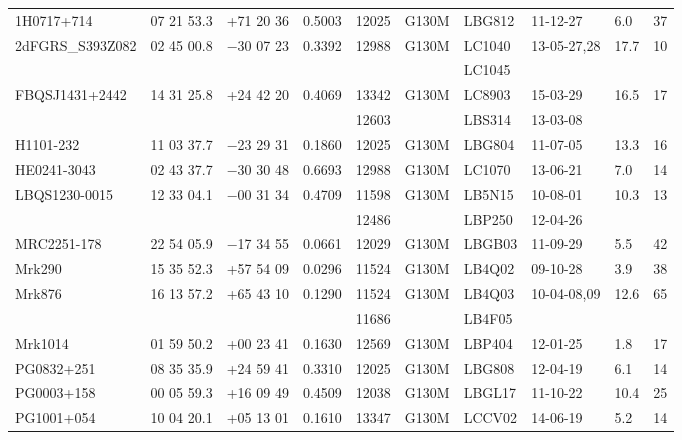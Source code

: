 \documentclass[twocolumn,tighten]{aastex6}
\begin{document}
\begin{table}[ht]
\begin{center}
\begin{tabular}{l l l l l l l l l l}
1H0717+714		  		&  07 21 53.3  &  +71 20  36	&    0.5003	& 12025	&   G130M	&   LBG812	& 11-12-27      	 	  &  6.0    &      37         \\
2dFGRS\_S393Z082  		&  02 45 00.8  &  $-$30 07  23	&    0.3392	& 12988	&   G130M	&   LC1040	& 13-05-27,28 	 	  & 17.7   &      10         \\
				  		&		       &			&			&		&			&    LC1045	&				  &	       &		   \\
FBQSJ1431+2442     		&  14 31 25.8  &  +24 42 20	&   0.4069		& 13342	&   G130M	&   LC8903	& 15-03-29		  & 16.5  &      17          \\
				 		&		       &			&			& 12603	&			&   LBS314	& 13-03-08		  &	      &		  	  \\
H1101-232   		 		&  11 03 37.7  &  $-$23 29 31	&   0.1860		& 12025	&   G130M	&   LBG804	& 11-07-05  		   & 13.3  &      16         \\
HE0241-3043  		 		&  02 43 37.7  &  $-$30 30 48	&   0.6693		& 12988	&   G130M	&   LC1070	& 13-06-21  		   & 7.0    &      14         \\
LBQS1230-0015  	 		&  12 33 04.1  &  $-$00 31 34    	&   0.4709		& 11598	&   G130M	&   LB5N15	& 10-08-01  		   & 10.3  &      13         \\
				 		&		       &			&			& 12486	&			&   LBP250	& 12-04-26		   &	       &	  	   \\
MRC2251-178  	 		&  22 54 05.9  &  $-$17 34 55	&   0.0661		& 12029	&   G130M	&   LBGB03	& 11-09-29                   &  5.5   &      42         \\
Mrk290  					&  15 35 52.3  &  +57 54 09	&   0.0296		& 11524	&   G130M	&   LB4Q02	& 09-10-28  		   &   3.9  &      38         \\
Mrk876  					&  16 13 57.2  &  +65 43 10	&   0.1290		& 11524	&   G130M	&   LB4Q03	& 10-04-08,09  		   & 12.6  &      65         \\
				 		&		       &			&			& 11686	&			&   LB4F05	&				   &	       &	  	   \\
Mrk1014  					&  01 59 50.2  &  +00 23 41	&   0.1630		& 12569	&   G130M	&   LBP404	& 12-01-25  		   &  1.8   &      17         \\
PG0832+251  				&  08 35 35.9  &  +24 59 41	&   0.3310		& 12025	&   G130M	&   LBG808	& 12-04-19		   &  6.1   &      14         \\
PG0003+158  				&  00 05 59.3  &  +16 09 49	&   0.4509		& 12038	&   G130M	&   LBGL17	& 11-10-22  		   & 10.4  &      25         \\
PG1001+054  				&  10 04 20.1  &  +05 13 01	&   0.1610		& 13347	&   G130M	&   LCCV02	& 14-06-19  		   &  5.2   &      14         \\

\end{tabular}
\end{center}
\end{table}
\end{document}
